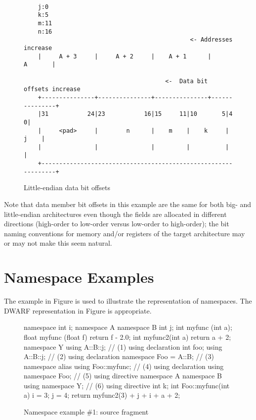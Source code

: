 \begin{figure}[ht]
\begin{dwflisting}
\begin{verbatim}

    j:0
    k:5
    m:11
    n:16
                                               <- Addresses increase
    |     A + 3     |     A + 2     |    A + 1      |       A       | 

                                        <-  Data bit offsets increase 
    +---------------+---------------+---------------+---------------+
    |31           24|23           16|15     11|10       5|4        0|
    |     <pad>     |        n      |    m    |    k     |     j    |
    |               |               |         |          |          |
    +---------------------------------------------------------------+

\end{verbatim}
\end{dwflisting}
\caption{Little-endian data bit offsets}
\label{fig:littleendiandatabitoffsets}
\end{figure}

Note that data member bit offsets in this example are the
same for both big- and little-endian architectures even
though the fields are allocated in different directions
(high-order to low-order versus low-order to high-order);
the bit naming conventions for memory and/or registers of
the target architecture may or may not make this seem natural.

\clearpage
\section{Namespace Examples}
\label{app:namespaceexamples}

The  example in 
Figure 
is used 
to illustrate the representation of namespaces.
The DWARF representation in 
Figure 
is appropriate.

\begin{figure}[ht]
\begin{nlnlisting}
namespace {
    int i;
}
namespace A {
    namespace B {
        int j;
        int   myfunc (int a);
        float myfunc (float f) { return f - 2.0; }
        int   myfunc2(int a)   { return a + 2; }
    }
}
namespace Y {
    using A::B::j;         // (1) using declaration
    int foo;
}
using A::B::j;             // (2) using declaration
namespace Foo = A::B;      // (3) namespace alias
using Foo::myfunc;         // (4) using declaration
using namespace Foo;       // (5) using directive
namespace A {
    namespace B {
        using namespace Y; // (6) using directive
        int k;
    }
}
int Foo::myfunc(int a)
{
    i = 3;
    j = 4;
    return myfunc2(3) + j + i + a + 2;
}
\end{nlnlisting}
\caption{Namespace example \#1: source fragment}
\label{fig:namespaceexample1sourcefragment}
\end{figure}


